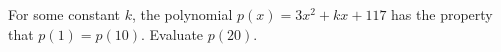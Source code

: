 For some constant $k$, the polynomial $p(x)=3x^2+kx+117$ has the property that $p(1)=p(10)$. Evaluate $p(20)$.
